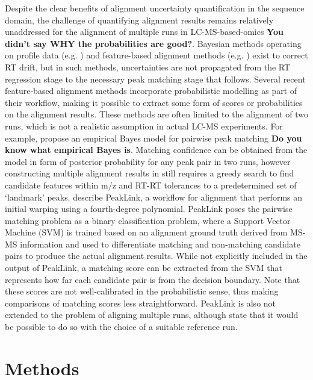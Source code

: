 Despite the clear benefits of alignment uncertainty quantification in the sequence domain, the challenge of quantifying alignment results remains relatively unaddressed for the alignment of multiple runs in LC-MS-based-omics \textbf{You didn't say WHY the probabilities are good?}. Bayesian methods operating on profile data (e.g. \cite{Listgarten2004, Kong2009, Tsai2013a}) and feature-based alignment methods (e.g. \cite{Fischer2006, Pluskal2010, Voss2011a}) exist to correct RT drift, but in such methods, uncertainties are not propagated from the RT regression stage to the necessary peak matching stage that follows. Several recent feature-based alignment methods incorporate probabilistic modelling as part of their workflow, making it possible to extract some form of scores or probabilities on the alignment results. These methods are often limited to the alignment of two runs, which is not a realistic assumption in actual LC-MS experiments. For example, \cite{Jeong2012} propose an empirical Bayes model for pairwise peak matching \textbf{Do you know what empirical Bayes is}. Matching confidence can be obtained from the model in form of posterior probability for any peak pair in two runs, however constructing multiple alignment results in \cite{Jeong2012} still requires a greedy search to find candidate features within m/z and RT-RT tolerances to a predetermined set of `landmark' peaks. \cite{GhanatBari2014b} describe PeakLink, a workflow for alignment that performs an initial warping using a fourth-degree polynomial. PeakLink poses the pairwise matching problem as a binary classification problem, where a Support Vector Machine (SVM) is trained based on an alignment ground truth derived from MS-MS information and used to differentiate matching and non-matching candidate pairs to produce the actual alignment results. While not explicitly included in the output of PeakLink, a matching score can be extracted from the SVM that represents how far each candidate pair is from the decision boundary. Note that these scores are not well-calibrated in the probabilistic sense, thus making comparisons of matching scores less straightforward. PeakLink is also not extended to the problem of aligning multiple runs, although \cite{GhanatBari2014b} state that it would be possible to do so with the choice of a suitable reference run.

\section{Methods}

